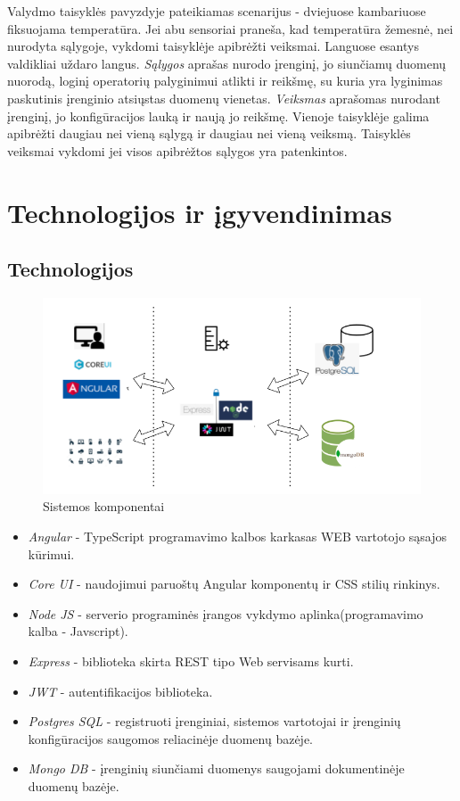 \documentclass{VUMIFInfBakalaurinis}
\begin{document}
Valydmo taisyklės pavyzdyje pateikiamas scenarijus - dviejuose kambariuose fiksuojama temperatūra. Jei abu sensoriai praneša, kad temperatūra žemesnė, nei nurodyta sąlygoje, vykdomi taisyklėje 
apibrėžti veiksmai. Languose esantys valdikliai uždaro langus. \emph{Sąlygos} aprašas nurodo įrenginį, jo siunčiamų duomenų nuorodą, loginį operatorių palyginimui atlikti ir reikšmę, su kuria yra lyginimas paskutinis įrenginio atsiųstas duomenų vienetas. \emph{Veiksmas} aprašomas nurodant įrenginį, jo konfigūracijos lauką ir naują jo reikšmę.
Vienoje taisyklėje galima apibrėžti daugiau nei vieną sąlygą ir daugiau nei vieną veiksmą. Taisyklės veiksmai vykdomi jei visos apibrėžtos sąlygos yra patenkintos.

\section{Technologijos ir įgyvendinimas}
\subsection{Technologijos}
\begin{figure}[H]
    \centering
    \includegraphics[scale=0.6]{img/arch-schema-v1}
    \caption{Sistemos komponentai}   %
    \label{img:mlp}
\end{figure}

\begin{itemize}
  \item \emph{Angular} - TypeScript programavimo kalbos karkasas WEB vartotojo sąsajos kūrimui.
  \item \emph{Core UI} - naudojimui paruoštų Angular komponentų ir CSS stilių rinkinys.
  \item \emph{Node JS} - serverio programinės įrangos vykdymo aplinka(programavimo kalba - Javscript).
  \item \emph{Express} - biblioteka skirta REST tipo Web servisams kurti.
  \item \emph{JWT} - autentifikacijos biblioteka.
  \item \emph{Postgres SQL} - registruoti įrenginiai, sistemos vartotojai ir įrenginių konfigūracijos saugomos reliacinėje duomenų bazėje.
  \item \emph{Mongo DB} - įrenginių siunčiami duomenys saugojami dokumentinėje duomenų bazėje. \cite{MONGODB, JOBD}
\end{itemize}
\end{document}

